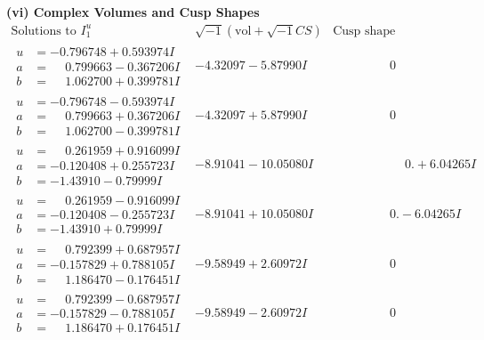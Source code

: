 \documentclass[1p]{elsarticle_modified}
\theoremstyle{definition}
\newcommand{\I}{\sqrt{-1}}
\begin{document}
\newpage\flushleft \textbf{(vi) Complex Volumes and Cusp Shapes}
$$\begin{array}{c|c|c}  
\text{Solutions to }I^u_{1}& \I (\text{vol} + \sqrt{-1}CS) & \text{Cusp shape}\\
 \hline 
\begin{aligned}
u &= -0.796748 + 0.593974 I \\
a &= \phantom{-}0.799663 - 0.367206 I \\
b &= \phantom{-}1.062700 + 0.399781 I\end{aligned}
 & -4.32097 - 5.87990 I & \phantom{-0.000000 } 0 \\ \hline\begin{aligned}
u &= -0.796748 - 0.593974 I \\
a &= \phantom{-}0.799663 + 0.367206 I \\
b &= \phantom{-}1.062700 - 0.399781 I\end{aligned}
 & -4.32097 + 5.87990 I & \phantom{-0.000000 } 0 \\ \hline\begin{aligned}
u &= \phantom{-}0.261959 + 0.916099 I \\
a &= -0.120408 + 0.255723 I \\
b &= -1.43910 - 0.79999 I\end{aligned}
 & -8.91041 - 10.05080 I & \phantom{-0.000000 -}0. + 6.04265 I \\ \hline\begin{aligned}
u &= \phantom{-}0.261959 - 0.916099 I \\
a &= -0.120408 - 0.255723 I \\
b &= -1.43910 + 0.79999 I\end{aligned}
 & -8.91041 + 10.05080 I & \phantom{-0.000000 } 0. - 6.04265 I \\ \hline\begin{aligned}
u &= \phantom{-}0.792399 + 0.687957 I \\
a &= -0.157829 + 0.788105 I \\
b &= \phantom{-}1.186470 - 0.176451 I\end{aligned}
 & -9.58949 + 2.60972 I & \phantom{-0.000000 } 0 \\ \hline\begin{aligned}
u &= \phantom{-}0.792399 - 0.687957 I \\
a &= -0.157829 - 0.788105 I \\
b &= \phantom{-}1.186470 + 0.176451 I\end{aligned}
 & -9.58949 - 2.60972 I & \phantom{-0.000000 } 0 \\ \hline\begin{aligned}

\end{aligned}
\end{array}$$
\end{document}
